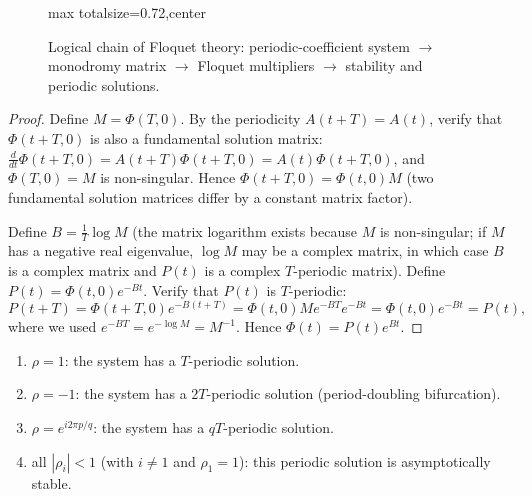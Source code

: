 \begin{figure}[htbp]
\centering
\begin{adjustbox}{max totalsize={\linewidth}{0.72\textheight},center}
\end{adjustbox}
\caption{Logical chain of Floquet theory: periodic-coefficient system $\to$ monodromy matrix $\to$ Floquet multipliers $\to$ stability and periodic solutions.}
\label{fig:floquet_flow}
\end{figure}

\begin{proof}
Define $M = \Phi(T, 0)$. By the periodicity $A(t+T) = A(t)$, verify that $\Phi(t+T, 0)$ is also a fundamental solution matrix: $\frac{d}{dt}\Phi(t+T, 0) = A(t+T)\Phi(t+T, 0) = A(t)\Phi(t+T, 0)$, and $\Phi(T, 0) = M$ is non-singular. Hence $\Phi(t+T, 0) = \Phi(t, 0) M$ (two fundamental solution matrices differ by a constant matrix factor).

Define $B = \frac{1}{T} \log M$ (the matrix logarithm exists because $M$ is non-singular; if $M$ has a negative real eigenvalue, $\log M$ may be a complex matrix, in which case $B$ is a complex matrix and $P(t)$ is a complex $T$-periodic matrix). Define $P(t) = \Phi(t, 0) e^{-Bt}$. Verify that $P(t)$ is $T$-periodic:
\[
P(t+T) = \Phi(t+T, 0) e^{-B(t+T)} = \Phi(t, 0) M e^{-BT} e^{-Bt} = \Phi(t, 0) e^{-Bt} = P(t),
\]
where we used $e^{-BT} = e^{-\log M} = M^{-1}$. Hence $\Phi(t) = P(t) e^{Bt}$.
\end{proof}

\begin{corollary}\label{cor:floquet_stability}
\begin{enumerate}[label=(\roman*)]
    \item $\rho = 1$: the system has a $T$-periodic solution.
    \item $\rho = -1$: the system has a $2T$-periodic solution (period-doubling bifurcation).
    \item $\rho = e^{i 2\pi p/q}$: the system has a $qT$-periodic solution.
    \item all $|\rho_i| < 1$ (with $i \neq 1$ and $\rho_1 = 1$): this periodic solution is asymptotically stable.
\end{enumerate}
\end{corollary}

